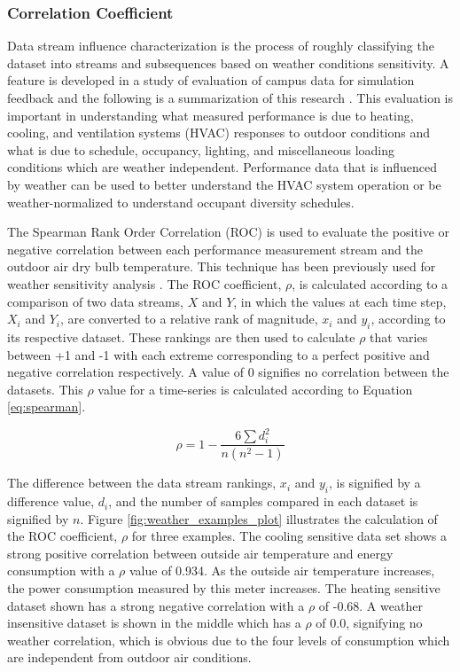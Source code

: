 \subsubsection{Correlation Coefficient}
\label{sec:weathercorrelationcoeff}

Data stream influence characterization is the process of roughly classifying the dataset into streams and subsequences based on weather conditions sensitivity. A feature is developed in a study of evaluation of campus data for simulation feedback and the following is a summarization of this research \cite{miller_forensically_2015}. This evaluation is important in understanding what measured performance is due to heating, cooling, and ventilation systems (HVAC) responses to outdoor conditions and what is due to schedule, occupancy, lighting, and miscellaneous loading conditions which are weather independent. Performance data that is influenced by weather can be used to better understand the HVAC system operation or be weather-normalized to understand occupant diversity schedules. %

The Spearman Rank Order Correlation (ROC) is used to evaluate the positive or negative correlation between each performance measurement stream and the outdoor air dry bulb temperature. This technique has been previously used for weather sensitivity analysis \cite{coughlin_statistical_2009}. The ROC coefficient, $\rho$, is calculated according to a comparison of two data streams, $X$ and $Y$, in which the values at each time step, $X_i$ and $Y_i$, are converted to a relative rank of magnitude, $x_i$ and $y_i$, according to its respective dataset. These rankings are then used to calculate $\rho$ that varies between +1 and -1 with each extreme corresponding to a perfect positive and negative correlation respectively. A value of 0 signifies no correlation between the datasets. This $\rho$ value for a time-series is calculated according to Equation \ref{eq:spearman}.

\begin{equation}
\rho = 1 - \frac{6\sum d_i^2}{n(n^2-1)}
\label{eq:spearman}
\end{equation}

The difference between the data stream rankings, $x_i$ and $y_i$, is signified by a difference value, $d_i$, and the number of samples compared in each dataset is signified by $n$. Figure \ref{fig:weather_examples_plot} illustrates the calculation of the ROC coefficient, $\rho$ for three examples. The cooling sensitive data set shows a strong positive correlation between outside air temperature and energy consumption with a $\rho$ value of 0.934. As the outside air temperature increases, the power consumption measured by this meter increases. The heating sensitive dataset shown has a strong negative correlation with a $\rho$ of -0.68. A weather insensitive dataset is shown in the middle which has a $\rho$ of 0.0, signifying no weather correlation, which is obvious due to the four levels of consumption which are independent from outdoor air conditions.